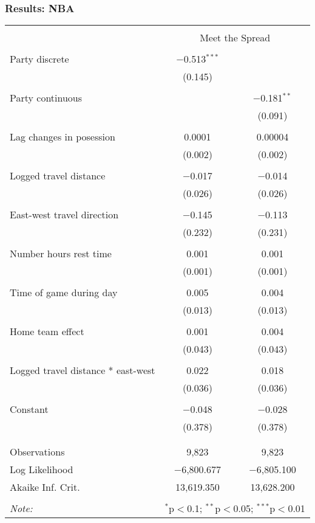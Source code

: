 \documentclass{beamer}
\begin{document}
\begin{frame}   \frametitle{Results: NBA}
  \vspace{-2pt}
  \centering
  \tiny{
  \begin{tabular}{@{\extracolsep{5pt}}lcc}  \\[-1.8ex]\hline   \\[-1.8ex] & \multicolumn{2}{c}{Meet the Spread} \\  \hline \\[-1.8ex]   Party discrete & $-$0.513$^{***}$ &  \\    & (0.145) &  \\ & & \\   [-1.8ex] Party continuous &  & $-$0.181$^{**}$ \\    &  & (0.091) \\    & & \\   Lag changes in posession & 0.0001 & 0.00004 \\    & (0.002) & (0.002) \\    & & \\   Logged travel distance & $-$0.017 & $-$0.014 \\    & (0.026) & (0.026) \\    & & \\   East-west travel direction & $-$0.145 & $-$0.113 \\    & (0.232) & (0.231) \\    & & \\   Number hours rest time & 0.001 & 0.001 \\    & (0.001) & (0.001) \\    & & \\   Time of game during day & 0.005 & 0.004 \\    & (0.013) & (0.013) \\    & & \\   Home team effect & 0.001 & 0.004 \\    & (0.043) & (0.043) \\    & & \\   Logged travel distance * east-west & 0.022 & 0.018 \\    & (0.036) & (0.036) \\    & & \\   Constant & $-$0.048 & $-$0.028 \\    & (0.378) & (0.378) \\ [-1.8ex] & & \\ \hline \\[-1.8ex]  Observations & 9,823 & 9,823 \\  Log Likelihood & $-$6,800.677 & $-$6,805.100 \\  Akaike Inf. Crit. & 13,619.350 & 13,628.200 \\  \hline  \hline \\[-1.8ex]  \textit{Note:}  & \multicolumn{2}{r}{$^{*}$p$<$0.1; $^{**}$p$<$0.05; $^{***}$p$<$0.01} \\  \end{tabular}
}   \end{frame}
\end{document}
